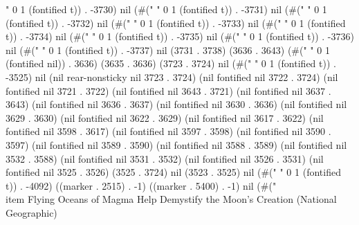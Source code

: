 " 0 1 (fontified t)) . -3730) nil (#(" " 0 1 (fontified t)) . -3731) nil (#(" " 0 1 (fontified t)) . -3732) nil (#(" " 0 1 (fontified t)) . -3733) nil (#(" " 0 1 (fontified t)) . -3734) nil (#(" " 0 1 (fontified t)) . -3735) nil (#(" " 0 1 (fontified t)) . -3736) nil (#(" " 0 1 (fontified t)) . -3737) nil (3731 . 3738) (3636 . 3643) (#(" " 0 1 (fontified nil)) . 3636) (3635 . 3636) (3723 . 3724) nil (#(" " 0 1 (fontified t)) . -3525) nil (nil rear-nonsticky nil 3723 . 3724) (nil fontified nil 3722 . 3724) (nil fontified nil 3721 . 3722) (nil fontified nil 3643 . 3721) (nil fontified nil 3637 . 3643) (nil fontified nil 3636 . 3637) (nil fontified nil 3630 . 3636) (nil fontified nil 3629 . 3630) (nil fontified nil 3622 . 3629) (nil fontified nil 3617 . 3622) (nil fontified nil 3598 . 3617) (nil fontified nil 3597 . 3598) (nil fontified nil 3590 . 3597) (nil fontified nil 3589 . 3590) (nil fontified nil 3588 . 3589) (nil fontified nil 3532 . 3588) (nil fontified nil 3531 . 3532) (nil fontified nil 3526 . 3531) (nil fontified nil 3525 . 3526) (3525 . 3724) nil (3523 . 3525) nil (#("
" 0 1 (fontified t)) . -4092) ((marker . 2515) . -1) ((marker . 5400) . -1) nil (#(" \\item Flying Oceans of Magma Help Demystify the Moon's Creation
       (National Geographic) \\\\
